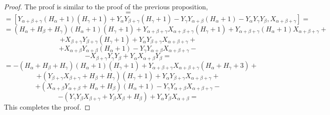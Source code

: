 \documentclass[twoside,a4paper,12pt]{article}
\theoremstyle{definition}
\begin{document}
\begin{proof}
	The proof is similar to the proof of the previous proposition,
	\begin{equation*}
		[B_{\alpha+\beta+\gamma},A_{\alpha+\beta+\gamma}]=
	\end{equation*}
	\begin{equation*}
		=[Y_{\alpha+\beta+\gamma}(H_\alpha+1)(H_\gamma+1)
		+Y_\alpha Y_{\beta+\gamma}(H_\gamma+1)
		-Y_\gamma Y_{\alpha+\beta}(H_\alpha+1)-Y_\alpha Y_\gamma Y_\beta,
		X_{\alpha+\beta+\gamma}]=
	\end{equation*}
	\begin{equation*}
		=(H_\alpha+H_\beta+H_\gamma)(H_\alpha+1)(H_\gamma+1)
		+Y_{\alpha+\beta+\gamma}X_{\alpha+\beta+\gamma}(H_\gamma+1)
		+Y_{\alpha+\beta+\gamma}(H_\alpha+1)X_{\alpha+\beta+\gamma}+
	\end{equation*}
	\begin{equation*}
		+X_{\beta+\gamma}Y_{\beta+\gamma}(H_\gamma+1)
		+Y_\alpha Y_{\beta+\gamma}X_{\alpha+\beta+\gamma}+
	\end{equation*}
	\begin{equation*}
		+X_{\alpha+\beta}Y_{\alpha+\beta}(H_\alpha+1)
		-Y_\gamma Y_{\alpha+\beta}X_{\alpha+\beta+\gamma}-
	\end{equation*}
	\begin{equation*}
		-X_{\beta+\gamma}Y_\gamma Y_\beta
		+Y_\alpha X_{\alpha+\beta}Y_\beta=
	\end{equation*}
	\begin{equation*}
		=-(H_\alpha+H_\beta+H_\gamma)(H_\alpha+1)(H_\gamma+1)
		+Y_{\alpha+\beta+\gamma}X_{\alpha+\beta+\gamma}(H_\alpha+H_\gamma+3)+
	\end{equation*}
	\begin{equation*}
		+(Y_{\beta+\gamma}X_{\beta+\gamma}+H_\beta+H_\gamma)(H_\gamma+1)
		+Y_\alpha Y_{\beta+\gamma}X_{\alpha+\beta+\gamma}+
	\end{equation*}
	\begin{equation*}
		+(X_{\alpha+\beta}Y_{\alpha+\beta}+H_\alpha+H_\beta)(H_\alpha+1)
		-Y_\gamma Y_{\alpha+\beta}X_{\alpha+\beta+\gamma}-
	\end{equation*}
	\begin{equation*}
		-(Y_\gamma Y_\beta X_{\beta+\gamma}+Y_\beta X_\beta+H_\beta)
		+Y_\alpha Y_\beta X_{\alpha+\beta}=
	\end{equation*}
	This completes the proof.
\end{proof}
\end{document}
